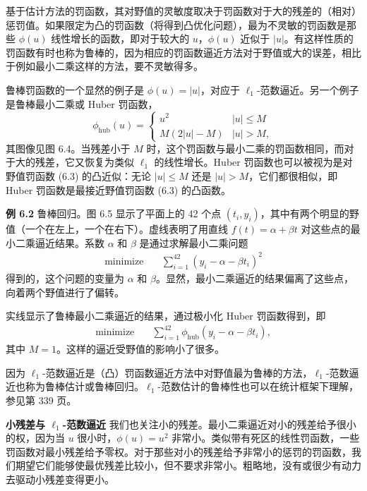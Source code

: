 \documentclass[UTF8, 12pt, fontset=fandol, oneside]{ctexart}
\begin{document}
基于估计方法的罚函数，其对野值的灵敏度取决于罚函数对于大的残差的（相对）惩罚值。如果限定为凸的罚函数（将得到凸优化问题），最为不灵敏的罚函数是那些 $\phi(u)$ 线性增长的函数，即对于较大的 $u$，$\phi(u)$ 近似于 $|u|$。有这样性质的罚函数有时也称为鲁棒的，因为相应的罚函数逼近方法对于野值或大的误差，相比于例如最小二乘这样的方法，要不灵敏得多。

鲁棒罚函数的一个显然的例子是 $\phi(u)=|u|$，对应于 $\ell_1$-范数逼近。另一个例子是鲁棒最小二乘或 Huber 罚函数，
\begin{equation}
\phi_{\mathrm{hub}}(u)=
\begin{cases}
u^2 & |u|\leq M\\
M(2|u|-M) & |u|>M,
\end{cases}
\tag{6.4}
\end{equation}
其图像见图 6.4。当残差小于 $M$ 时，这个罚函数与最小二乘的罚函数相同，而对于大的残差，它又恢复为类似 $\ell_1$ 的线性增长。Huber 罚函数也可以被视为是对野值罚函数 (6.3) 的凸近似：无论 $|u|\leq M$ 还是 $|u|>M$，它们都很相似，即 Huber 罚函数是最接近野值罚函数 (6.3) 的凸函数。

\noindent\textbf{例 6.2}\quad
鲁棒回归。图 6.5 显示了平面上的 42 个点 $(t_i,y_i)$，其中有两个明显的野值（一个在左上，一个在右下）。虚线表明了用直线 $f(t)=\alpha+\beta t$ 对这些点的最小二乘逼近结果。系数 $\alpha$ 和 $\beta$ 是通过求解最小二乘问题
\[
\begin{aligned}
\text{minimize}\quad & \sum_{i=1}^{42}(y_i-\alpha-\beta t_i)^2
\end{aligned}
\]
得到的，这个问题的变量为 $\alpha$ 和 $\beta$。显然，最小二乘逼近的结果偏离了这些点，向着两个野值进行了偏转。

实线显示了鲁棒最小二乘逼近的结果，通过极小化 Huber 罚函数得到，即
\[
\begin{aligned}
\text{minimize}\quad & \sum_{i=1}^{42}\phi_{\mathrm{hub}}(y_i-\alpha-\beta t_i),
\end{aligned}
\]
其中 $M=1$。这样的逼近受野值的影响小了很多。

因为 $\ell_1$-范数逼近是（凸）罚函数逼近方法中对野值最为鲁棒的方法，$\ell_1$-范数逼近也称为鲁棒估计或鲁棒回归。$\ell_1$-范数估计的鲁棒性也可以在统计框架下理解，参见第 339 页。

\noindent\textbf{小残差与 $\ell_1$-范数逼近}\quad
我们也关注小的残差。最小二乘逼近对小的残差给予很小的权，因为当 $u$ 很小时，$\phi(u)=u^2$ 非常小。类似带有死区的线性罚函数，一些罚函数对最小残差给予零权。对于那些对小的残差给予非常小的惩罚的罚函数，我们期望它们能够使最优残差比较小，但不要求非常小。粗略地，没有或很少有动力去驱动小残差变得更小。
\end{document}
